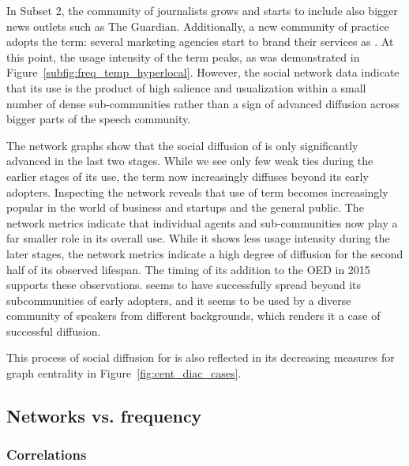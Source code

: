 \documentclass[
  a4paper,
  abstract=on,
  captions=tableabove
  ]{scrartcl}
\begin{document}
      In Subset 2, the community of journalists grows and starts to include also bigger news outlets such as The Guardian. Additionally, a new community of practice adopts the term: several marketing agencies start to brand their services as . At this point, the usage intensity of the term peaks, as was demonstrated in Figure~\ref{subfig:freq_temp_hyperlocal}. However, the social network data indicate that its use is the product of high salience and usualization within a small number of dense sub-communities rather than a sign of advanced diffusion across bigger parts of the speech community.

      The network graphs show that the social diffusion of  is only significantly advanced in the last two stages. While we see only few weak ties during the earlier stages of its use, the term now increasingly diffuses beyond its early adopters. Inspecting the network reveals that use of term becomes increasingly popular in the world of business and startups and the general public. The network metrics indicate that individual agents and sub-communities now play a far smaller role in its overall use. While it shows less usage intensity during the later stages, the network metrics indicate a high degree of diffusion for the second half of its observed lifespan. The timing of its addition to the OED in 2015 supports these observations.  seems to have successfully spread beyond its subcommunities of early adopters, and it seems to be used by a diverse community of speakers from different backgrounds, which renders it a case of successful diffusion.

      This process of social diffusion for  is also reflected in its decreasing measures for graph centrality in Figure~\ref{fig:cent_diac_cases}.


  \subsection{Networks vs. frequency}
    \label{subsec:nets-vs-freq}

    \subsubsection{Correlations}
      \label{subsubsec:corr}
\end{document}
